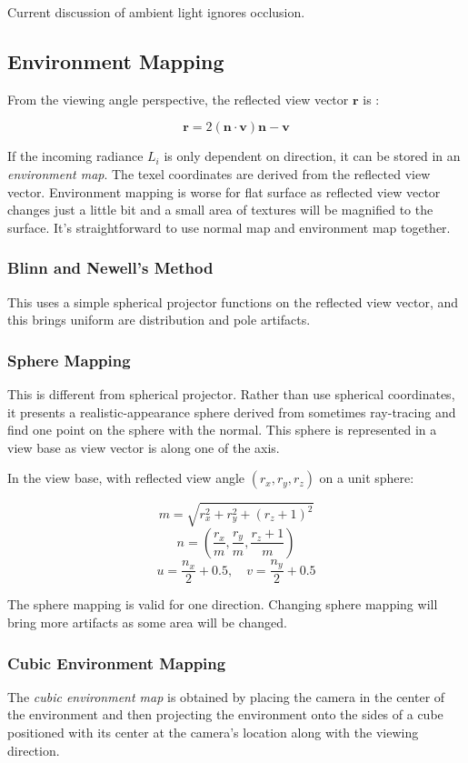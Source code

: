 \documentclass[10pt, a4paper]{article}
\begin{document}
        Current discussion of ambient light ignores occlusion. 
    
    \subsection{Environment Mapping}
        From the viewing angle perspective, the reflected view vector $\textbf{r}$ is :

        $$\textbf{r} = 2(\textbf{n} \cdot \textbf{v})\textbf{n} - \textbf{v}$$

        If the incoming radiance $L_i$ is only dependent on direction, it can be stored in an \emph{environment map}. The texel coordinates are derived from the reflected view vector. Environment mapping is worse for flat surface as reflected view vector changes just a little bit and a small area of textures will be magnified to the surface. It's straightforward to use normal map and environment map together. 

        \subsubsection{Blinn and Newell's Method}
            This uses a simple spherical projector functions on the reflected view vector, and this brings uniform are distribution and pole artifacts. 
        \subsubsection{Sphere Mapping}
            This is different from spherical projector. Rather than use spherical coordinates, it presents a realistic-appearance sphere derived from sometimes ray-tracing and find one point on the sphere with the normal. This sphere is represented in a view base as view vector is along one of the axis. 

            In the view base, with reflected view angle $(r_x, r_y, r_z)$ on a unit sphere:

            $$m = \sqrt{r_x^2 + r_y^2 + (r_z + 1)^2}$$
            $$n = (\frac{r_x}{m}, \frac{r_y}{m}, \frac{r_z + 1}{m})$$
            $$u = \frac{n_x}{2} + 0.5, \quad v = \frac{n_y}{2} + 0.5$$

            The sphere mapping is valid for one direction. Changing sphere mapping will bring more artifacts as some area will be changed. 
        
        \subsubsection{Cubic Environment Mapping}
            The \emph{cubic environment map} is obtained by placing the camera in the center of the environment and then projecting the environment onto the sides of a cube positioned with its center at the camera's location along with the viewing direction.
            

        
\end{document}
